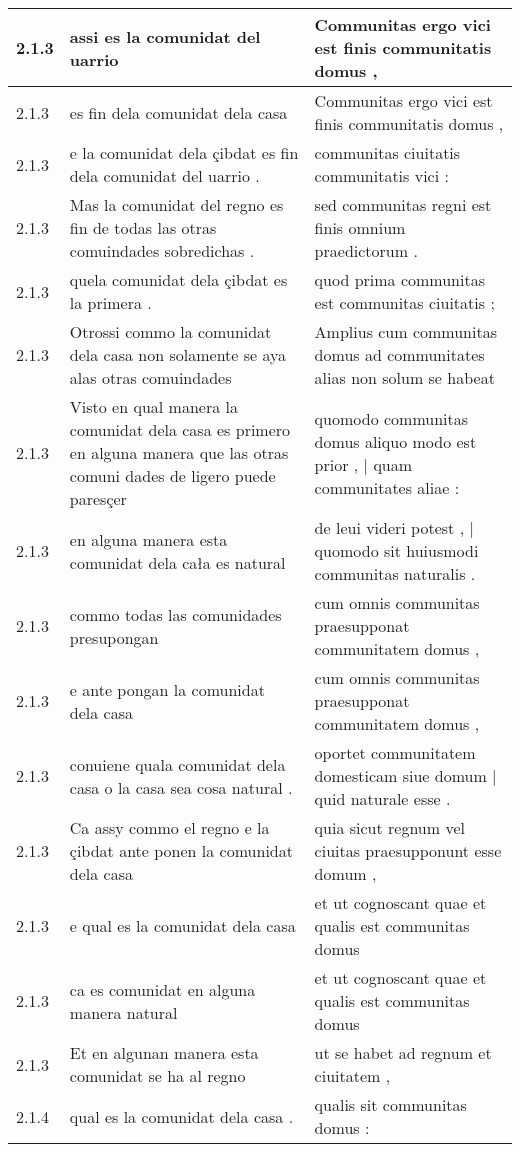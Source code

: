 \begin{tabular}{|p{1cm}|p{6.5cm}|p{6.5cm}|}
2.1.3 & assi es la comunidat del uarrio & Communitas ergo vici est finis communitatis domus , \\\hline
2.1.3 & es fin dela comunidat dela casa & Communitas ergo vici est finis communitatis domus , \\\hline
2.1.3 & e la comunidat dela çibdat es fin dela comunidat del uarrio . & communitas ciuitatis communitatis vici : \\\hline
2.1.3 & Mas la comunidat del regno es fin de todas las otras comuindades sobredichas . & sed communitas regni est finis omnium praedictorum . \\\hline
2.1.3 & quela comunidat dela çibdat es la primera . & quod prima communitas est communitas ciuitatis ; \\\hline
2.1.3 & Otrossi commo la comunidat dela casa non solamente se aya alas otras comuindades & Amplius cum communitas domus ad communitates alias non solum se habeat \\\hline
2.1.3 & Visto en qual manera la comunidat dela casa es primero en alguna manera que las otras comuni dades de ligero puede paresçer & quomodo communitas domus aliquo modo est prior , | quam communitates aliae : \\\hline
2.1.3 & en alguna manera esta comunidat dela cała es natural & de leui videri potest , | quomodo sit huiusmodi communitas naturalis . \\\hline
2.1.3 & commo todas las comunidades presupongan & cum omnis communitas praesupponat communitatem domus , \\\hline
2.1.3 & e ante pongan la comunidat dela casa & cum omnis communitas praesupponat communitatem domus , \\\hline
2.1.3 & conuiene quala comunidat dela casa o la casa sea cosa natural . & oportet communitatem domesticam siue domum | quid naturale esse . \\\hline
2.1.3 & Ca assy commo el regno e la çibdat ante ponen la comunidat dela casa & quia sicut regnum vel ciuitas praesupponunt esse domum , \\\hline
2.1.3 & e qual es la comunidat dela casa & et ut cognoscant quae et qualis est communitas domus \\\hline
2.1.3 & ca es comunidat en alguna manera natural & et ut cognoscant quae et qualis est communitas domus \\\hline
2.1.3 & Et en algunan manera esta comunidat se ha al regno & ut se habet ad regnum et ciuitatem , \\\hline
2.1.4 & qual es la comunidat dela casa . & qualis sit communitas domus : \\\hline

\end{tabular}
